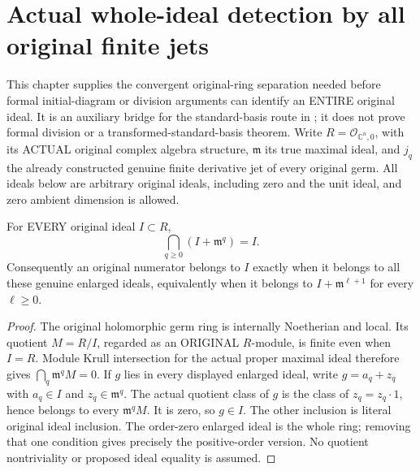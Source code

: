 \section{Actual whole-ideal detection by all original finite jets}

This chapter supplies the convergent original-ring separation needed before
formal initial-diagram or division arguments can identify an ENTIRE original
ideal. It is an auxiliary bridge for the standard-basis route in
\cite[\S7, pp.~260--263]{bierstone-milman97-invent-math}; it does not prove
formal division or a transformed-standard-basis theorem.
Write $R=\mathcal O_{\mathbb C^n,0}$, with its ACTUAL original complex
algebra structure, $\mathfrak m$ its true maximal ideal, and $j_q$ the
already constructed genuine finite derivative jet of every original germ.
All ideals below are arbitrary original ideals, including zero and the unit
ideal, and zero ambient dimension is allowed.

\begin{theorem}
\label{hir:actual-whole-ideal-maximal-filtration-separated}
\leanok
For EVERY original ideal $I\subset R$,
\[
 \bigcap_{q\ge0}(I+\mathfrak m^q)=I.
\]
Consequently an original numerator belongs to $I$ exactly when it belongs
to all these genuine enlarged ideals, equivalently when it belongs to
$I+\mathfrak m^{\ell+1}$ for every $\ell\ge0$.
\end{theorem}
\begin{proof}
The original holomorphic germ ring is internally Noetherian and local.
Its quotient $M=R/I$, regarded as an ORIGINAL $R$-module, is finite even
when $I=R$. Module Krull intersection for the actual proper maximal ideal
therefore gives $\bigcap_q\mathfrak m^q M=0$. If $g$ lies in every
displayed enlarged ideal, write $g=a_q+z_q$ with $a_q\in I$ and
$z_q\in\mathfrak m^q$. The actual quotient class of $g$ is the class of
$z_q=z_q\cdot1$, hence belongs to every $\mathfrak m^q M$. It is zero,
so $g\in I$. The other inclusion is literal original ideal inclusion.
The order-zero enlarged ideal is the whole ring; removing that one
condition gives precisely the positive-order version. No quotient
nontriviality or proposed ideal equality is assumed.
\end{proof}

